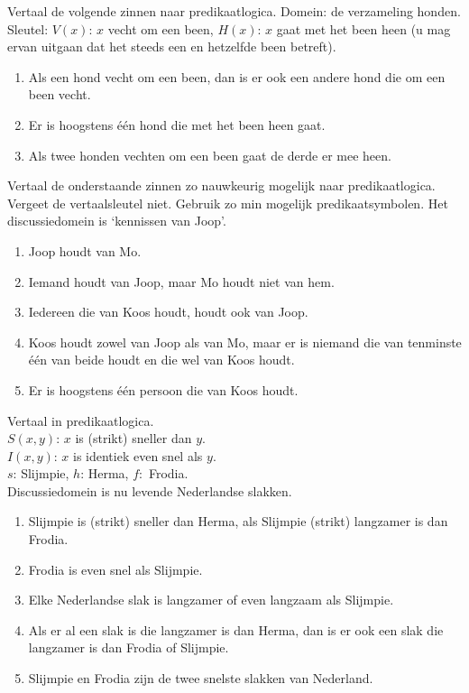 \begin{answer}
Vertaal de volgende zinnen naar predikaatlogica. Domein: de verzameling honden. Sleutel: $V(x)$: $x$ vecht om een been, $H(x)$: $x$ gaat met het been heen (u mag ervan uitgaan dat het steeds een en hetzelfde been betreft).
\begin{enumerate}
    \item Als een hond vecht om een been, dan is er ook een andere hond die om een been vecht.
    \item Er is hoogstens \'e\'en hond die met het been heen gaat.
    \item Als twee honden vechten om een been gaat de derde er mee heen.
\end{enumerate}
\end{answer}

\begin{answer}
Vertaal de onderstaande zinnen zo nauwkeurig mogelijk naar predikaatlogica. Vergeet de vertaalsleutel niet. Gebruik zo min mogelijk predikaatsymbolen. Het discussiedomein is `kennissen van Joop'.
\begin{enumerate}[label=\textit{\alph*.}]
    \item Joop houdt van Mo.
    \item Iemand houdt van Joop, maar Mo houdt niet van hem.
    \item Iedereen die van Koos houdt, houdt ook van Joop.
    \item Koos houdt zowel van Joop als van Mo, maar er is niemand die van tenminste \'e\'en van beide houdt en die wel van Koos houdt.
    \item Er is hoogstens \'e\'en persoon die van Koos houdt.
\end{enumerate}
\end{answer}

\begin{answer}
Vertaal in predikaatlogica.\\
$S(x,y)$: $x$ is (strikt) sneller dan $y$.\\
$I(x,y)$: $x$ is identiek even snel als $y$.\\
$s$: Slijmpie, $h$: Herma, $f:$ Frodia.\\
Discussiedomein is nu levende Nederlandse slakken.
\begin{enumerate}[label=\textit{\alph*.}]
    \item Slijmpie is (strikt) sneller dan Herma, als Slijmpie (strikt) langzamer is dan Frodia.
    \item Frodia is even snel als Slijmpie.
    \item Elke Nederlandse slak is langzamer of even langzaam als Slijmpie.
    \item Als er al een slak is die langzamer is dan Herma, dan is er ook een slak die langzamer is dan Frodia of Slijmpie.
    \item Slijmpie en Frodia zijn de twee snelste slakken van Nederland.
\end{enumerate}
\end{answer}


